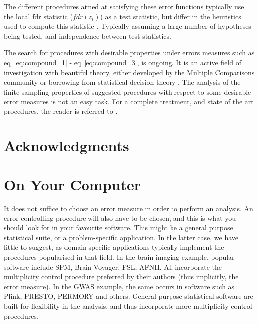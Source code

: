 \documentclass[review,12pt]{article}
\begin{document}
The different procedures aimed at satisfying these error functions typically use the local fdr statistic ($fdr(z_i)$) as a test statistic, but differ in the heuristics used to  compute this statistic \cite[eg.][]{storey_direct_2002,efron_microarrays_2008,sun_oracle_2007}. Typically assuming a large number of hypotheses being tested, and independence between test statistics. 

The search for procedures with desirable properties under errors measures such as eq~\ref{eq:compound_1}  - eq~\ref{eq:compound_3}, is ongoing. It is an active field of investigation with beautiful theory, either developed by the Multiple Comparisons community or borrowing from statistical decision theory \cite[see][]{sun_oracle_2007}. The analysis of the finite-sampling properties of suggested procedures with respect to some desirable error measures is not an easy task.  For a complete treatment, and state of the art procedures, the reader is referred to \cite{efron_large-scale_2010}.








\section{Acknowledgments}


\appendix

\section{\label{sec:on_your_pc} On Your Computer}
It does not suffice to choose an error measure in order to perform an analysis. An error-controlling procedure will also have to be chosen, and this is what you should look for in your favourite software. This might be a general purpose statistical suite, or a problem-specific application. In the latter case, we have little to suggest, as domain specific applications typically implement the procedures popularised in that field. 
In the brain imaging example, popular software include SPM, Brain Voyager, FSL, AFNII. All incorporate the multiplicity control procedure preferred by their authors (thus implicitly, the error measure). 
In the GWAS example, the same occurs in software such as Plink, PRESTO, PERMORY and others. 
General purpose statistical software are built for flexibility in the analysis, and thus incorporate more multiplicity control procedures. 
\end{document}
